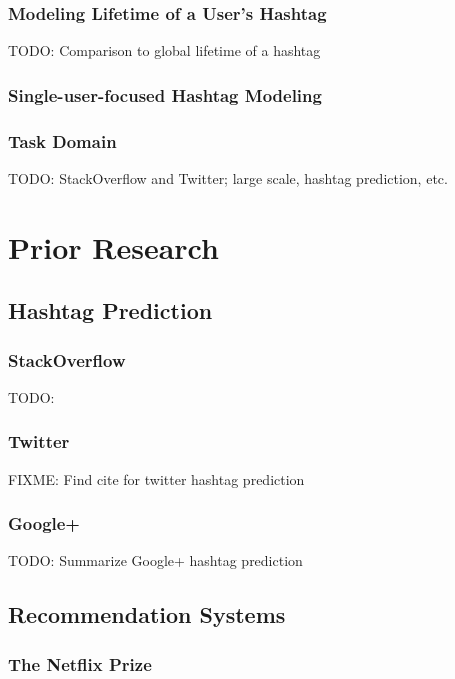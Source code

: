 \documentclass[man]{apa6}
\begin{document}
\subsubsection{Modeling Lifetime of a User's Hashtag}

TODO: Comparison to global lifetime of a hashtag \cite{Tsur2012}

\subsubsection{Single-user-focused Hashtag Modeling}

\subsubsection{Task Domain}

TODO: StackOverflow and Twitter; large scale, hashtag prediction, etc. 

\section{Prior Research}

\subsection{Hashtag Prediction}

\subsubsection{StackOverflow}

TODO: \cite{Kuo2011}

\subsubsection{Twitter}

FIXME: Find cite for twitter hashtag prediction

\subsubsection{Google+}

TODO: Summarize Google+ hashtag prediction \cite{GoogleKeynote2013}

\subsection{Recommendation Systems}

\subsubsection{The Netflix Prize}
\end{document}
